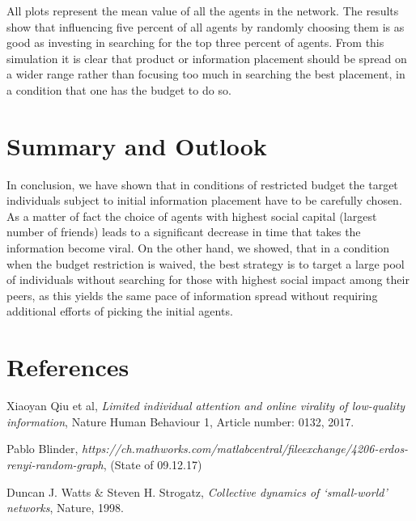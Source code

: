 \documentclass[11pt]{article}
\begin{document}
All plots represent the mean value of all the agents in the network. The results show that influencing five percent of all agents by randomly choosing them is as good as investing in searching for the top three percent of agents. From this simulation it is clear that product or information placement should be spread on a wider range rather than focusing too much in searching the best placement, in a condition that one has the budget to do so. 


\section{Summary and Outlook}

In conclusion, we have shown that in conditions of restricted budget the target individuals subject to initial information placement have to be carefully chosen. As a matter of fact the choice of agents with highest social capital (largest number of friends) leads to a significant decrease in time that takes the information become viral. On the other hand, we showed, that in a condition when the budget restriction is waived, the best strategy is to target a large pool of individuals without searching for those with highest social impact among their peers, as this yields the same pace of information spread without requiring additional efforts of picking the initial agents.   
\section{References}

\begingroup
\renewcommand{\section}[2]{ }

\begin{thebibliography}{9}
	Xiaoyan Qiu et al,
	\textit{Limited individual attention and online virality of low-quality information},
	Nature Human Behaviour 1,
	Article number: 0132,
	2017.
	
	Pablo Blinder, \textit{https://ch.mathworks.com/matlabcentral/fileexchange/4206-erdos-renyi-random-graph}, (State of 09.12.17)
	
	Duncan J. Watts \& Steven H. Strogatz,
	\textit{Collective dynamics of ‘small-world’ networks},
	Nature,
	1998.
	
\end{thebibliography}
\endgroup

\newpage

\end{document}
